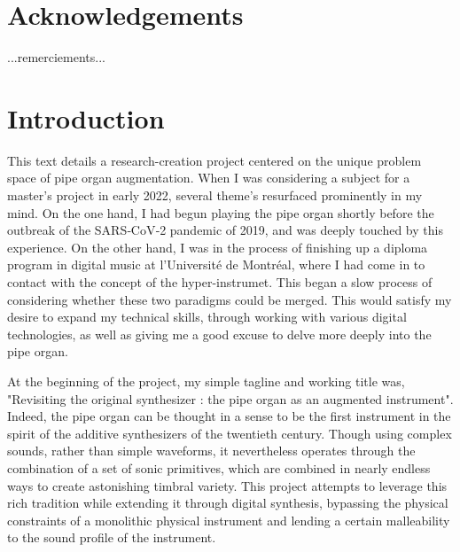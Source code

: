 \documentclass[12pt,twoside,maitrise]{dms_ks}
\theoremstyle{definition}
\begin{document}

\chapter*{Acknowledgements}

...remerciements...


\NoChapterPageNumber
\cleardoublepage


\chapter*{Introduction}

This text details a research-creation project centered on the unique problem space of pipe organ augmentation. 
When I was considering a subject for a master's project in early 2022, several theme's resurfaced prominently in my mind. 
On the one hand, I had begun playing the pipe organ shortly before the outbreak of the SARS‑CoV‑2 pandemic of 2019, and was deeply touched by this experience. 
On the other hand, I was in the process of finishing up a diploma program in digital music at l'Université de Montréal, where I had come in to contact with the concept of the hyper-instrumet. 
This began a slow process of considering whether these two paradigms could be merged. 
This would satisfy my desire to expand my technical skills, through working with various digital technologies, as well as giving me a good excuse to delve more deeply into the pipe organ.

At the beginning of the project, my simple tagline and working title was, "Revisiting the original synthesizer : the pipe organ as an augmented instrument". 
Indeed, the pipe organ can be thought in a sense to be the first instrument in the spirit of the additive synthesizers of the twentieth century. 
Though using complex sounds, rather than simple waveforms, it nevertheless operates through the combination of a set of sonic primitives, which are combined in nearly endless ways to create astonishing timbral variety. 
This project attempts to leverage this rich tradition while extending it through digital synthesis, bypassing the physical constraints of a monolithic physical instrument and lending a certain malleability to the sound profile of the instrument.
\end{document}
